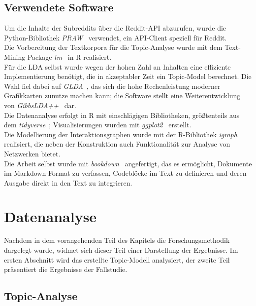 \documentclass[11pt,a4paper,twoside]{article}
\begin{document}
\hypertarget{software}{%
\subsection{Verwendete Software}\label{software}}

Um die Inhalte der Subreddits über die Reddit-API abzurufen, wurde die
Python-Bibliothek \emph{PRAW}~\autocite{PRAW} verwendet, ein API-Client
speziell für Reddit.\\
Die Vorbereitung der Textkorpora für die Topic-Analyse wurde mit dem
Text-Mining-Package \emph{tm}~\autocite{R-tm} in R realisiert.\\
Für die LDA selbst wurde wegen der hohen Zahl an Inhalten eine
effiziente Implementierung benötigt, die in akzeptabler Zeit ein
Topic-Model berechnet. Die Wahl fiel dabei auf
\emph{GLDA}~\autocite{Lu2013}, das sich die hohe Rechenleistung moderner
Grafikkarten zunutze machen kann; die Software stellt eine
Weiterentwicklung von \emph{GibbsLDA++}~\autocite{Phan2007} dar.\\
Die Datenanalyse erfolgt in R mit einschlägigen Bibliotheken,
größtenteils aus dem \emph{tidyverse}~\autocite{R-tidyverse};
Visualisierungen wurden mit \emph{ggplot2}~\autocite{R-ggplot2}
erstellt.\\
Die Modellierung der Interaktionsgraphen wurde mit der R-Bibliothek
\emph{igraph}~\autocite{R-igraph} realisiert, die neben der Konstruktion
auch Funktionalität zur Analyse von Netzwerken bietet.\\
Die Arbeit selbst wurde mit \emph{bookdown}~\autocite{R-bookdown}
angefertigt, das es ermöglicht, Dokumente im Markdown-Format zu
verfassen, Codeblöcke im Text zu definieren und deren Ausgabe direkt in
den Text zu integrieren.

\clearpage

\hypertarget{datenanalyse}{%
\section{Datenanalyse}\label{datenanalyse}}

Nachdem in dem vorangehenden Teil des Kapitels die Forschungsmethodik
dargelegt wurde, widmet sich dieser Teil einer Darstellung der
Ergebnisse. Im ersten Abschnitt wird das erstellte Topic-Modell
analysiert, der zweite Teil präsentiert die Ergebnisse der Fallstudie.

\hypertarget{topic-analyse}{%
\subsection{Topic-Analyse}\label{topic-analyse}}
\end{document}
